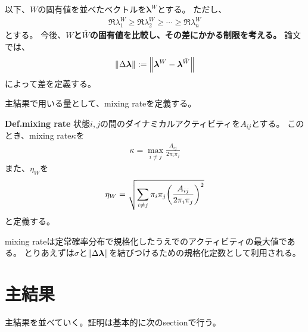 \documentclass[a4paper,11pt]{jsarticle}
\numberwithin{equation}{section}
\begin{document}
以下、$W$の固有値を並べたベクトルを$\bm{\lambda}^W$とする。
ただし、
\begin{align}
    \Re \lambda_1^W \geq \Re \lambda_2^W \geq \cdots \geq \Re \lambda_n^W
\end{align}
とする。
今後、\textbf{$W$と$\bar{W}$の固有値を比較し、その差にかかる制限を考える。}
論文では、
\begin{align}
    \norm{\Delta \bm{\lambda}} := \norm{\bm{\lambda}^W - \bm{\lambda}^{\bar{W}}} 
\end{align}
によって差を定義する。

主結果で用いる量として、mixing rateを定義する。
\begin{itembox}[l]{\textbf{Def.mixing rate}}
    状態$i,j$の間のダイナミカルアクティビティを$A_{ij}$とする。
    このとき、mixing rate$\kappa$を
    \begin{align}
        \kappa = \max_{i \neq j} \frac{A_{ij}}{2\pi_i \pi_j}
    \end{align}
    また、$\eta_{W}$を
    \begin{align}
        \eta_{W} = \sqrt{\sum_{i \neq j} \pi_i \pi_j \qty(\frac{A_{ij}}{2\pi_i \pi_j})^2}
    \end{align}
    と定義する。
\end{itembox}
mixing rateは定常確率分布で規格化したうえでのアクティビティの最大値である。
とりあえずは$\sigma$と$\norm{\Delta \bm{\lambda}}$を結びつけるための規格化定数として利用される。

\section{主結果}
主結果を並べていく。証明は基本的に次のsectionで行う。
\end{document}
